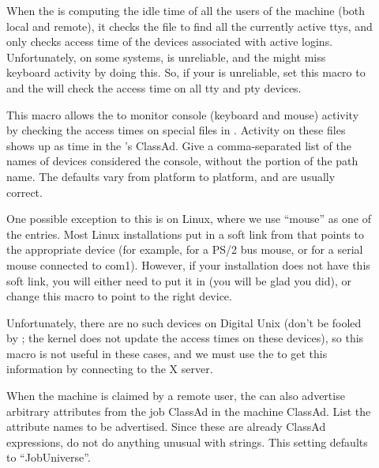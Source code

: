 \begin{description}
\item[] \label{param:StartdHasBadUtmp}
  When the  is computing the idle time of all the
  users of the machine (both local and remote), it checks the
   file to find all the currently active ttys, and only
  checks access time of the devices associated with active logins.
  Unfortunately, on some systems,  is unreliable, and the
   might miss keyboard activity by doing this.  So, if your
   is unreliable, set this macro to  and the
   will check the access time on all tty and pty devices.
  
\item[] \label{param:ConsoleDevices} This
  macro allows the  to monitor console (keyboard and mouse)
  activity by checking the access times on special files in
  .  Activity on these files shows up as 
  time in the 's ClassAd.  Give a comma-separated list of
  the names of devices considered the console, without the
   portion of the path name.  The defaults vary from
  platform to platform, and are usually correct.  

  One possible exception to this is on Linux, where
  we use ``mouse'' as
  one of the entries.  Most Linux installations put in a
  soft link from  that points to the appropriate
  device (for example,  for a PS/2 bus mouse, or
   for a serial mouse connected to com1).  However,
  if your installation does not have this soft link, you will either
  need to put it in (you will be glad you did), or change this
  macro to point to the right device. 
  
  Unfortunately, there are no such devices on Digital Unix
  (don't be fooled by ; the kernel does not
  update the access times on these devices), so this macro is not
  useful in these cases, and we must use the  to get this
  information by connecting to the X server.
  
\item[] \label{param:StartdJobExprs} When
  the machine is claimed by a remote user, the  can also advertise
  arbitrary attributes from the job ClassAd in the machine
  ClassAd.
  List the attribute names to be advertised.  \Note Since
  these are already ClassAd expressions, do not do anything
  unusual with strings.   
  This setting defaults to ``JobUniverse''.


\end{description}
